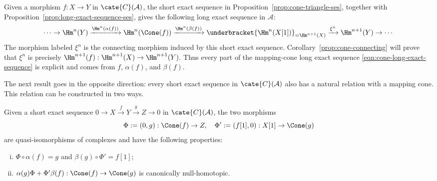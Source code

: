 Given a morphism $f:X\to Y$ in $\cate{C}(\mathcal{A})$, the short exact
sequence in Proposition~\ref{prop:cone-triangle-ses}, together with
Proposition~\ref{prop:long-exact-sequence-ses}, gives the following long exact
sequence in $\mathcal{A}$:
\begin{equation}\label{eqn:cone-long-exact-sequence}
	\cdots \to \Hm^n(Y) \xrightarrow{\Hm^n(\alpha(f))} \Hm^n(\Cone(f)) \xrightarrow{\Hm^n(\beta(f))} \underbracket{\Hm^n(X[1])}_{= \Hm^{n+1}(X)} \xrightarrow{\xi^n} \Hm^{n+1}(Y) \to \cdots
\end{equation}
The morphism labeled $\xi^n$ is the connecting morphism induced by this short
exact sequence. Corollary~\ref{prop:cone-connecting} will prove that $\xi^n$
is precisely $\Hm^{n+1}(f):\Hm^{n+1}(X)\to\Hm^{n+1}(Y)$. Thus every part of
the mapping-cone long exact sequence \eqref{eqn:cone-long-exact-sequence} is
explicit and comes from $f$, $\alpha(f)$, and $\beta(f)$.

The next result goes in the opposite direction: every short exact sequence in
$\cate{C}(\mathcal{A})$ also has a natural relation with a mapping cone. This
relation can be constructed in two ways.

\begin{lemma}\label{prop:cone-qis}
	Given a short exact sequence
	$0\to X\xrightarrow{f}Y\xrightarrow{g}Z\to0$ in
	$\cate{C}(\mathcal{A})$, the two morphisms
	\[ \Phi := (0, g): \Cone(f) \to Z, \quad \Phi' := (f[1], 0): X[1] \to \Cone(g) \]
	are quasi-isomorphisms of complexes and have the following properties:
	\begin{enumerate}[(i)]
		\item $\Phi \circ \alpha(f) = g$ and $\beta(g) \circ \Phi' = f[1]$;
		\item $\alpha(g)\Phi + \Phi'\beta(f):\Cone(f)\to\Cone(g)$ is
		canonically null-homotopic.
	\end{enumerate}
\end{lemma}

